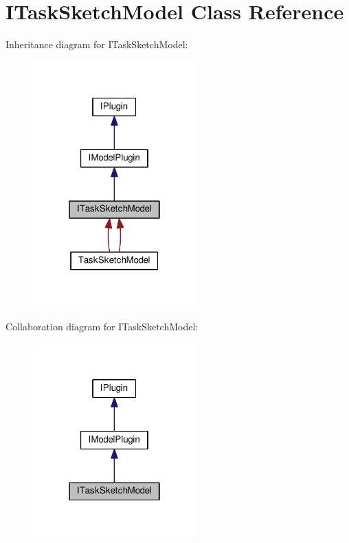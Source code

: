 \hypertarget{class_i_task_sketch_model}{}\section{I\+Task\+Sketch\+Model Class Reference}
\label{class_i_task_sketch_model}


Inheritance diagram for I\+Task\+Sketch\+Model\+:\nopagebreak
\begin{figure}[H]
\begin{center}
\leavevmode
\includegraphics[width=178pt]{class_i_task_sketch_model__inherit__graph}
\end{center}
\end{figure}


Collaboration diagram for I\+Task\+Sketch\+Model\+:\nopagebreak
\begin{figure}[H]
\begin{center}
\leavevmode
\includegraphics[width=178pt]{class_i_task_sketch_model__coll__graph}
\end{center}
\end{figure}
